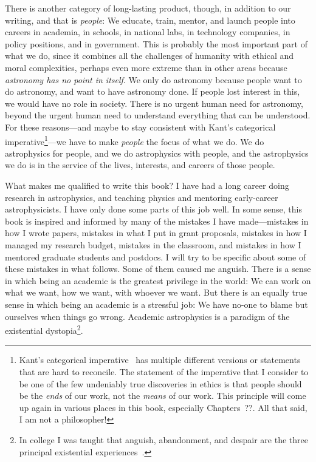 \documentclass[letterpaper]{book}
\begin{document}
There is another category of long-lasting product, though, in addition to our writing, and that is \emph{people}:
We educate, train, mentor, and launch people into careers in academia, in schools, in national labs, in technology companies, in policy positions, and in government.
This is probably the most important part of what we do, since it combines all the challenges of humanity with ethical and moral complexities, perhaps even more extreme than in other areas because \emph{astronomy has no point in itself}.
We only do astronomy because people want to do astronomy, and want to have astronomy done.
If people lost interest in this, we would have no role in society.
There is no urgent human need for astronomy, beyond the urgent human need to understand everything that can be understood.
For these reasons---and maybe to stay consistent with Kant's categorical imperative\footnote{Kant's categorical imperative~\cite{} has multiple different versions or statements that are hard to reconcile. The statement of the imperative that I consider to be one of the few undeniably true discoveries in ethics is that people should be the \emph{ends} of our work, not the \emph{means} of our work. This principle will come up again in various places in this book, especially Chapters~??. All that said, I am not a philosopher!}---we have to make \emph{people} the focus of what we do.
We do astrophysics for people, and we do astrophysics with people, and the astrophysics we do is in the service of the lives, interests, and careers of those people.

What makes me qualified to write this book?
I have had a long career doing research in astrophysics, and teaching physics and mentoring early-career astrophysicists.
I have only done some parts of this job well.
In some sense, this book is inspired and informed by many of the mistakes I have made---mistakes in how I wrote papers, mistakes in what I put in grant proposals, mistakes in how I managed my research budget, mistakes in the classroom, and mistakes in how I mentored graduate students and postdocs.
I will try to be specific about some of these mistakes in what follows.
Some of them caused me anguish.
There is a sense in which being an academic is the greatest privilege in the world: We can work on what we want, how we want, with whoever we want.
But there is an equally true sense in which being an academic is a stressful job: We have no-one to blame but ourselves when things go wrong.
Academic astrophysics is a paradigm of the existential dystopia\footnote{In college I was taught that anguish, abandonment, and despair are the three principal existential experiences~\cite{}.}.
\end{document}
